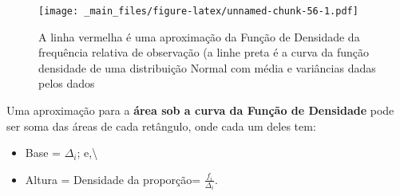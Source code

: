 \documentclass[
]{book}
\newenvironment{Shaded}{\begin{snugshade}}{\end{snugshade}}
\newcommand{\AttributeTok}[1]{\textcolor[rgb]{0.77,0.63,0.00}{#1}}
\newcommand{\DecValTok}[1]{\textcolor[rgb]{0.00,0.00,0.81}{#1}}
\newcommand{\FloatTok}[1]{\textcolor[rgb]{0.00,0.00,0.81}{#1}}
\newcommand{\FunctionTok}[1]{\textcolor[rgb]{0.00,0.00,0.00}{#1}}
\newcommand{\NormalTok}[1]{#1}
\newcommand{\OtherTok}[1]{\textcolor[rgb]{0.56,0.35,0.01}{#1}}
\newcommand{\SpecialCharTok}[1]{\textcolor[rgb]{0.00,0.00,0.00}{#1}}
\newcommand{\StringTok}[1]{\textcolor[rgb]{0.31,0.60,0.02}{#1}}
\providecommand{\tightlist}{%
  \setlength{\itemsep}{0pt}\setlength{\parskip}{0pt}}
\begin{document}
\begin{Shaded}
\end{Shaded}

\begin{figure}
\centering
\texttt{[image: \_main\_files/figure-latex/unnamed-chunk-56-1.pdf]}
\caption{\label{fig:unnamed-chunk-56}A linha vermelha é uma aproximação da Função de Densidade da frequência relativa de observação (a linhe preta é a curva da função densidade de uma distribuição Normal com média e variâncias dadas pelos dados}
\end{figure}

\hfill\break

Uma aproximação para a \textbf{área sob a curva da Função de Densidade} pode ser soma das áreas de cada retângulo, onde cada um deles tem:

\begin{itemize}
\tightlist
\item
  Base = \(\Delta_{i}\); e,\textbackslash{}
\item
  Altura = Densidade da proporção= \(\frac{f_{i}}{\Delta_{i}}\).
\end{itemize}
\end{document}

